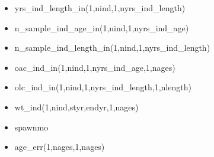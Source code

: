 \documentclass{article}
\begin{document}
\begin{itemize}
    \item yrs\_ind\_length\_in(1,nind,1,nyrs\_ind\_length)
    \item n\_sample\_ind\_age\_in(1,nind,1,nyrs\_ind\_age)
    \item n\_sample\_ind\_length\_in(1,nind,1,nyrs\_ind\_length)
    \item oac\_ind\_in(1,nind,1,nyrs\_ind\_age,1,nages)
    \item olc\_ind\_in(1,nind,1,nyrs\_ind\_length,1,nlength)
    \item wt\_ind(1,nind,styr,endyr,1,nages) 
    \item spawnmo
    \item age\_err(1,nages,1,nages)

 

\end{itemize}
\end{document}
